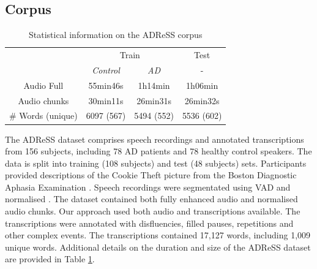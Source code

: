 \subsection{Corpus}
\begin{table}[h]
  \begin{center}
   \begin{tabular}{c|ccc}
    \hline
                    & \multicolumn{2}{c}{Train} & Test       \\ \cline{2-4}
                    & \textit{Control}     & \textit{AD}          & -          \\ \hline
  Audio Full        & 55min46s    & 1h14min     & 1h06min    \\
  Audio chunks      & 30min11s    & 26min31s    & 26min32s   \\
  \# Words (unique) & 6097 (567)  & 5494 (552)  & 5536 (602) \\ \hline
  \end{tabular}
  \caption{Statistical information on the ADReSS corpus}
  \label{tab:adress_data}
  \end{center}
  \end{table}
The ADReSS dataset comprises speech recordings and annotated transcriptions from 156 subjects, including 78 \ac{AD} patients and 78 healthy control speakers. The data is split into training (108 subjects) and test (48 subjects) sets. Participants provided descriptions of the Cookie Theft picture from the Boston Diagnostic Aphasia Examination \cite{goodglass2001bdae}. Speech recordings were segmentated using \ac{VAD} and normalised \cite{luz2020alzheimer}. The dataset contained both fully enhanced audio and normalised audio chunks. Our approach used both audio and transcriptions available. The transcriptions were annotated with disfluencies, filled pauses, repetitions and other complex events. The transcriptions contained 17,127 words, including 1,009 unique words. Additional details on the duration and size of the ADReSS dataset are provided in Table \ref{tab:adress_data}.
